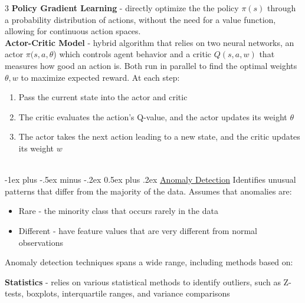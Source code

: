 \documentclass[10pt,landscape,letterpaper]{article}
\makeatletter
\renewcommand{\section}{\@startsection{section}{1}{0mm}%
                                {-1ex plus -.5ex minus -.2ex}%
                                {0.5ex plus .2ex}%
                                {\normalfont\large\bfseries}}
\makeatother
\begin{document}
\begin{multicols}{3}
\textbf{Policy Gradient Learning} - directly optimize the the policy $\pi(s)$ through a probability distribution of actions, without the need for a value function, allowing for continuous action spaces.  \\
\smallskip
\textbf{Actor-Critic Model} - hybrid algorithm that relies on two neural networks, an actor $\pi(s,a,\theta$) which controls agent behavior  and a critic $Q(s,a,w)$ that measures how good an action is. Both run in parallel to find the optimal weights $\theta, w$ to maximize expected reward. At each step:
\begin{enumerate}[leftmargin=5mm]
\itemsep -.4mm
\item Pass the current state into the actor and critic
\item The critic evaluates the action's Q-value, and the actor updates its weight $\theta$
\item The actor takes the next action leading to a new state, and the critic updates its weight $w$
\end{enumerate}
\columnbreak

\textcolor{white}{.}\vspace{-3mm}\\ %
\section{\href{https://migue-rc.github.io/Data-Science-Cheatsheet/\#anomaly-detection}{Anomaly Detection}}
Identifies unusual patterns that differ from the majority of the data. Assumes that anomalies are:
\begin{itemize}[label={--},leftmargin=4mm]
\itemsep -.4mm
\item Rare - the minority class that occurs rarely in the data
\item Different - have feature values that are very different from normal observations
\end{itemize}
\smallskip
Anomaly detection techniques spans a wide range, including methods based on:

\textbf{Statistics} - relies on various statistical methods to identify outliers, such as Z-tests, boxplots, interquartile ranges, and variance comparisons


\end{multicols}
\end{document}
